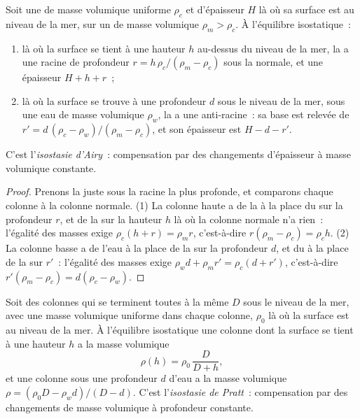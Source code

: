\begin{proposition}\label{prop:b1:isostasy-gravity:airy}
Soit une  de masse volumique uniforme $\rho_c$ et d'épaisseur $H$ là où sa
surface est au niveau de la mer, sur un  de masse volumique $\rho_m > \rho_c$.
À l'équilibre isostatique~:
\begin{enumerate}
  \item là où la surface se tient à une hauteur $h$ au-dessus du niveau de la mer,
        la  a une racine de profondeur $r = h\,\rho_c/(\rho_m - \rho_c)$ sous
        la  normale, et une épaisseur $H + h + r$~;
  \item là où la surface se trouve à une profondeur $d$ sous le niveau de la mer,
        sous une eau de masse volumique $\rho_w$, la  a une anti-racine~: sa
        base est relevée de
        $r' = d\,(\rho_c - \rho_w)/(\rho_m - \rho_c)$, et son épaisseur est
        $H - d - r'$.
\end{enumerate}
C'est l'\emph{isostasie d'Airy}~: compensation par des
changements d'épaisseur à masse volumique constante.
\end{proposition}

\begin{proof}
Prenons la  juste sous la racine la plus profonde, et
comparons chaque colonne à la colonne normale. (1) La colonne haute a de la  à
la place du  sur la profondeur $r$, et de la  sur la hauteur $h$ là où
la colonne normale n'a rien~: l'égalité des masses exige $\rho_c(h + r) = \rho_m r$,
c'est-à-dire $r(\rho_m - \rho_c) = \rho_c h$. (2) La colonne basse a de l'eau à la
place de la  sur la profondeur $d$, et du  à la place de la  sur
$r'$~: l'égalité des masses exige
$\rho_w d + \rho_m r' = \rho_c(d + r')$, c'est-à-dire $r'(\rho_m - \rho_c) =
d(\rho_c - \rho_w)$.
\end{proof}

\begin{proposition}\label{prop:b1:isostasy-gravity:pratt}
Soit des colonnes qui se terminent toutes à la même  $D$
sous le niveau de la mer, avec une masse volumique uniforme dans chaque colonne,
$\rho_0$ là où la surface est au niveau de la mer. À l'équilibre isostatique une
colonne dont la surface se tient à une hauteur $h$ a la masse volumique
\[
  \rho(h) = \rho_0\,\frac{D}{D + h},
\]
et une colonne sous une profondeur $d$ d'eau a la masse volumique
$\rho = (\rho_0 D - \rho_w d)/(D - d)$. C'est l'\emph{isostasie de
Pratt}~: compensation par des changements de masse
volumique à profondeur constante.
\end{proposition}

